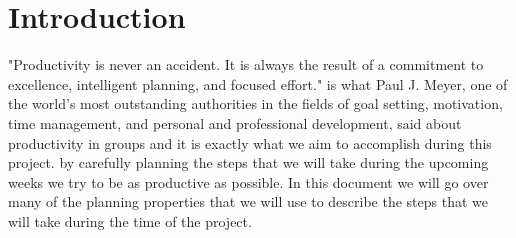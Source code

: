 \section{Introduction}
"Productivity is never an accident. It is always the result of a commitment to excellence, intelligent planning, and focused effort." is what Paul J. Meyer, one of the world's most outstanding authorities in the fields of goal setting, motivation, time management, and personal and professional development, said about productivity in groups and it is exactly what we aim to accomplish during this project. by carefully planning the steps that we will take during the upcoming weeks we try to be as productive as possible. In this document we will go over many of the planning properties that we will use to describe the steps that we will take during the time of the project.
